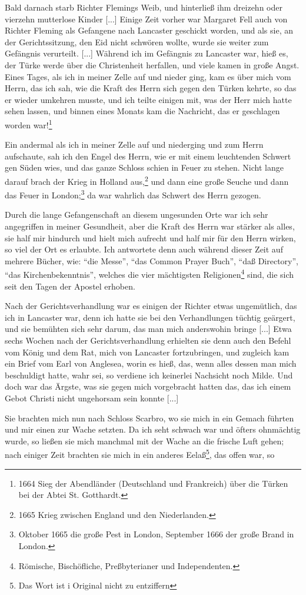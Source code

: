 Bald darnach starb Richter Flemings Weib, und hinterließ
ihm dreizehn oder vierzehn mutterlose Kinder [...]
Einige Zeit vorher war Margaret Fell auch von Richter
Fleming als Gefangene nach Lancaster geschickt worden, und als
sie, an der Gerichtssitzung, den Eid nicht schwören wollte, wurde
sie weiter zum Gefängnis verurteilt. [...]
Während ich im Gefängnis zu Lancaster war, hieß es, der
Türke werde über die Christenheit herfallen, und viele kamen in
große Angst. Eines Tages, als ich in meiner Zelle auf und
nieder ging, kam es über mich vom Herrn, das ich sah, wie die
Kraft des Herrn sich gegen den Türken kehrte, so das er wieder
umkehren musste, und ich teilte einigen mit, was der Herr mich
hatte sehen lassen, und binnen eines Monats kam die Nachricht,
das er geschlagen worden war!\footnote{1664 Sieg der 
Abendländer (Deutschland und Frankreich) über die
Türken bei der Abtei St. Gotthardt.}

Ein andermal als ich in meiner Zelle auf und niederging
und zum Herrn aufschaute, sah ich den Engel des Herrn, wie er
mit einem leuchtenden Schwert gen Süden wies, und das ganze
Schloss schien in Feuer zu stehen. Nicht lange darauf brach der
Krieg in Holland aus,\footnote{1665 Krieg zwischen England 
und den Niederlanden.} und dann eine große Seuche und dann das
Feuer in London;\footnote{Oktober 1665 die große Pest in London, 
September 1666 der große Brand in London.} da war wahrlich 
das Schwert des Herrn gezogen.

Durch die lange Gefangenschaft an diesem ungesunden Orte
war ich sehr angegriffen in meiner Gesundheit, aber die Kraft
des Herrn war stärker als alles, sie half mir hindurch und hielt
mich aufrecht und half mir für den Herrn wirken, so viel der
Ort es erlaubte. Ich antwortete denn auch während dieser Zeit
auf mehrere Bücher, wie: "`die Messe"', "`das Common Prayer
Buch"', "`daß Directory"', "`das Kirchenbekenntnis"', welches die
vier mächtigsten Religionen\footnote{Römische, Bischöfliche, 
Preßbyterianer und Independenten.} sind, die sich seit den Tagen der
Apostel erhoben.

Nach der Gerichtsverhandlung war es einigen der Richter
etwas ungemütlich, das ich in Lancaster war, denn ich hatte sie
bei den Verhandlungen tüchtig geärgert, und sie bemühten sich
sehr darum, das man mich anderswohin bringe [...] Etwa sechs
Wochen nach der Gerichtsverhandlung erhielten sie denn auch den
Befehl vom König und dem Rat, mich von Lancaster fortzubringen,
und zugleich kam ein Brief vom Earl von 
Anglesea, worin es
hieß, das, wenn alles dessen man mich beschuldigt hatte, wahr
sei, so verdiene ich keinerlei Nachsicht noch Milde. Und doch war
das Ärgste, was sie gegen mich vorgebracht hatten das, das ich
einem Gebot Christi nicht ungehorsam sein konnte [...]

Sie brachten mich nun nach Schloss Scarbro, wo sie mich in
ein Gemach führten und mir einen zur Wache setzten. Da ich seht
schwach war und öfters ohnmächtig wurde, so ließen sie mich
manchmal mit der Wache an die frische Luft gehen; nach einiger
Zeit brachten sie mich in ein anderes Eelaß\footnote{Das Wort 
ist i Original nicht zu entziffern}, das offen war, so